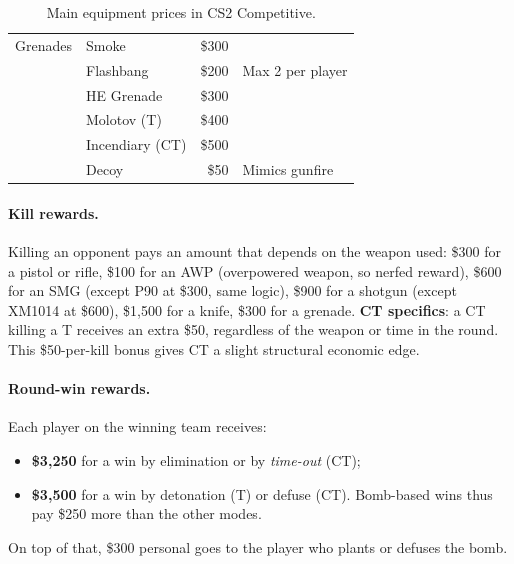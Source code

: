 \begin{table}[!htbp]
\begin{tabular}{@{}ll r l@{}}
\midrule
Grenades            & Smoke                & \$300  & \\
                    & Flashbang            & \$200  & Max 2 per player \\
                    & HE Grenade           & \$300  & \\
                    & Molotov (T)          & \$400  & \\
                    & Incendiary (CT)      & \$500  & \\
                    & Decoy                & \$50   & Mimics gunfire \\
\bottomrule
\end{tabular}
\caption{Main equipment prices in CS2 Competitive.}
\label{tab:prices}
\end{table}
\FloatBarrier

\paragraph{Kill rewards.}
Killing an opponent pays an amount that depends on the weapon used:
\$300 for a pistol or rifle, \$100 for an AWP (overpowered weapon, so
nerfed reward), \$600 for an SMG (except P90 at \$300, same logic),
\$900 for a shotgun (except XM1014 at \$600), \$1{,}500 for a knife,
\$300 for a grenade. \textbf{CT specifics}: a CT killing a T receives
an extra \$50, regardless of the weapon or time in the round. This
\$50-per-kill bonus gives CT a slight structural economic edge.

\paragraph{Round-win rewards.}
Each player on the winning team receives:
\begin{itemize}
  \item \textbf{\$3{,}250} for a win by elimination or by
    \emph{time-out} (CT);
  \item \textbf{\$3{,}500} for a win by detonation (T) or defuse (CT).
    Bomb-based wins thus pay \$250 more than the other modes.
\end{itemize}
On top of that, \$300 personal goes to the player who plants or
defuses the bomb.

